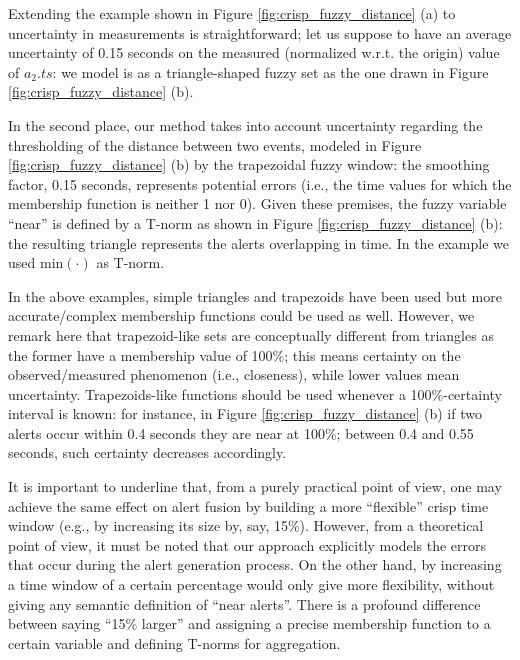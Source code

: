 Extending the example shown in Figure \ref{fig:crisp_fuzzy_distance} (a) to uncertainty in measurements is straightforward; let us suppose to have an average uncertainty of 0.15 seconds on the measured (normalized w.r.t. the origin) value of $a_{2}.ts$: we model is as a triangle-shaped fuzzy set as the one drawn in Figure \ref{fig:crisp_fuzzy_distance} (b).

In the second place, our method takes into account uncertainty regarding the thresholding of the distance between two events, modeled in Figure \ref{fig:crisp_fuzzy_distance} (b) by the trapezoidal fuzzy window: the smoothing factor, 0.15 seconds, represents potential errors (i.e., the time values for which the membership function is neither 1 nor 0). Given these premises, the fuzzy variable ``near'' is defined by a T-norm \citep{folger_klir} as shown in Figure \ref{fig:crisp_fuzzy_distance} (b): the resulting triangle represents the alerts overlapping in time. In the example we used $\mathrm{min}(\cdot)$ as T-norm.

In the above examples, simple triangles and trapezoids have been used
but more accurate/complex membership functions could be used as
well. However, we remark here that trapezoid-like sets are
conceptually different from triangles as the former have a membership
value of 100\%; this means certainty on the observed/measured
phenomenon (i.e., closeness), while lower values mean
uncertainty. Trapezoids-like functions should be used whenever a
100\%-certainty interval is known: for instance, in Figure
\ref{fig:crisp_fuzzy_distance} (b) if two alerts occur within 0.4
seconds they are near at 100\%; between 0.4 and 0.55 seconds, such
certainty decreases accordingly.

\begin{note}
  It is important to underline that, from a purely practical point of
  view, one may achieve the same effect on alert fusion by building a
  more ``flexible'' crisp time window (e.g., by increasing its size
  by, say, 15\%). However, from a theoretical point of view, it must
  be noted that our approach explicitly models the errors that occur
  during the alert generation process. On the other hand, by
  increasing a time window of a certain percentage would only give
  more flexibility, without giving any semantic definition of ``near
  alerts''. There is a profound difference between saying ``15\%
  larger'' and assigning a precise membership function to a certain
  variable and defining T-norms for aggregation.
\end{note}

